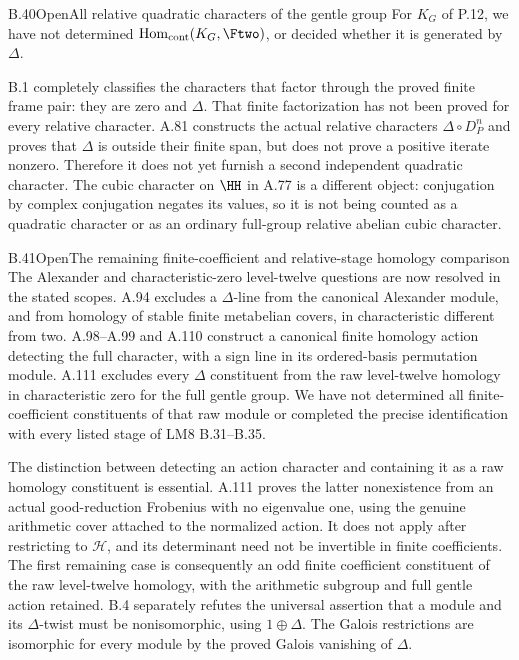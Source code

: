 \begin{statement}{B.40}{Open}{All relative quadratic characters of the gentle group}
For $K_G$ of P.12, we have not determined
$\operatorname{Hom}_{\rm cont}(K_G,\Ftwo)$, or decided
whether it is generated by $\Delta$.
\end{statement}
B.1 completely classifies the characters that factor through
the proved finite frame pair: they are zero and $\Delta$.
That finite factorization has not been proved for every
relative character. A.81 constructs the actual relative
characters $\Delta\circ D_P^n$ and proves that $\Delta$
is outside their finite span, but does not prove a positive
iterate nonzero. Therefore it does not yet furnish a second
independent quadratic character. The cubic character on
$\HH$ in A.77 is a different object: conjugation by complex
conjugation negates its values, so it is not being counted
as a quadratic character or as an ordinary full-group
relative abelian cubic character.

\begin{statement}{B.41}{Open}{The remaining finite-coefficient and relative-stage homology comparison}
The Alexander and characteristic-zero level-twelve questions
are now resolved in the stated scopes. A.94 excludes a
$\Delta$-line from the canonical Alexander module, and from
homology of stable finite metabelian covers, in characteristic
different from two. A.98--A.99 and A.110 construct a canonical
finite homology action detecting the full character, with a
sign line in its ordered-basis permutation module.
A.111 excludes every $\Delta$ constituent from the raw
level-twelve homology in characteristic zero for the full
gentle group. We have not determined all finite-coefficient
constituents of that raw module or completed the precise
identification with every listed stage of LM8 B.31--B.35.
\end{statement}
The distinction between detecting an action character and
containing it as a raw homology constituent is essential.
A.111 proves the latter nonexistence from an actual
good-reduction Frobenius with no eigenvalue one, using the
genuine arithmetic cover attached to the normalized action.
It does not apply after restricting to $\mathcal H$, and its
determinant need not be invertible in finite coefficients.
The first remaining case is consequently an odd finite
coefficient constituent of the raw level-twelve homology,
with the arithmetic subgroup and full gentle action retained.
B.4 separately
refutes the universal assertion that a module and its
$\Delta$-twist must be nonisomorphic, using
$1\oplus\Delta$. The Galois restrictions are isomorphic
for every module by the proved Galois vanishing of $\Delta$.
